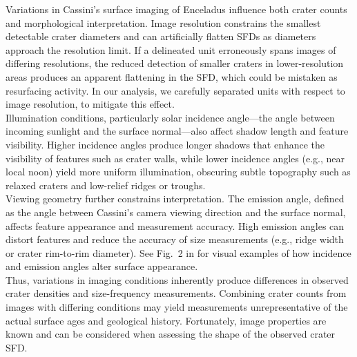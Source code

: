 \documentclass[preprint,11pt,3p,times,authoryear]{elsarticle}
\begin{document}
Variations in Cassini's surface imaging of Enceladus influence both crater counts and morphological interpretation. Image resolution constrains the smallest detectable crater diameters and can artificially flatten SFDs as diameters approach the resolution limit. If a delineated unit erroneously spans images of differing resolutions, the reduced detection of smaller craters in lower-resolution areas produces an apparent flattening in the SFD, which could be mistaken as resurfacing activity. In our analysis, we carefully separated units with respect to image resolution, to mitigate this effect.\\

Illumination conditions, particularly solar incidence angle—the angle between incoming sunlight and the surface normal—also affect shadow length and feature visibility. Higher incidence angles produce longer shadows that enhance the visibility of features such as crater walls, while lower incidence angles (e.g., near local noon) yield more uniform illumination, obscuring subtle topography such as relaxed craters and low-relief ridges or troughs.\\

Viewing geometry further constrains interpretation. The emission angle, defined as the angle between Cassini's camera viewing direction and the surface normal, affects feature appearance and measurement accuracy. High emission angles can distort features and reduce the accuracy of size measurements (e.g., ridge width or crater rim-to-rim diameter). See Fig.~2 in \citet{Bland2018} for visual examples of how incidence and emission angles alter surface appearance.\\

Thus, variations in imaging conditions inherently produce differences in observed crater densities and size-frequency measurements. Combining crater counts from images with differing conditions may yield measurements unrepresentative of the actual surface ages and geological history. Fortunately, image properties are known and can be considered when assessing the shape of the observed crater SFD. 
\end{document}
